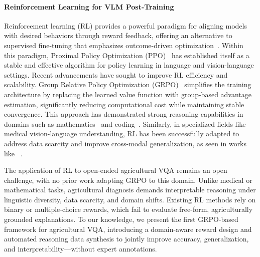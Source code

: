 \documentclass[11pt]{article}
\begin{document}
\paragraph{Reinforcement Learning for VLM Post-Training}
Reinforcement learning (RL) provides a powerful paradigm for aligning models with desired behaviors through reward feedback, offering an alternative to supervised fine-tuning that emphasizes outcome-driven optimization~\cite{christiano2017deep,ladosz2022exploration}. Within this paradigm, Proximal Policy Optimization (PPO)~\cite{schulman2017proximal} has established itself as a stable and effective algorithm for policy learning in language and vision-language settings. Recent advancements have sought to improve RL efficiency and scalability. Group Relative Policy Optimization (GRPO)~\cite{shao2024deepseekmath} simplifies the training architecture by replacing the learned value function with group-based advantage estimation, significantly reducing computational cost while maintaining stable convergence. This approach has demonstrated strong reasoning capabilities in domains such as mathematics~\cite{shao2024deepseekmath} and coding~\cite{guo2025deepseek}. Similarly, in specialized fields like medical vision-language understanding, RL has been successfully adapted to address data scarcity and improve cross-modal generalization, as seen in works like ~\citet{zhi2025medgr}.


The application of RL to open-ended agricultural VQA remains an open challenge, with no prior work adapting GRPO to this domain. Unlike medical or mathematical tasks, agricultural diagnosis demands interpretable reasoning under linguistic diversity, data scarcity, and domain shifts. Existing RL methods rely on binary or multiple-choice rewards, which fail to evaluate free-form, agriculturally grounded explanations. To our knowledge, we present the first GRPO-based framework for agricultural VQA, introducing a domain-aware reward design and automated reasoning data synthesis to jointly improve accuracy, generalization, and interpretability—without expert annotations.
\end{document}
